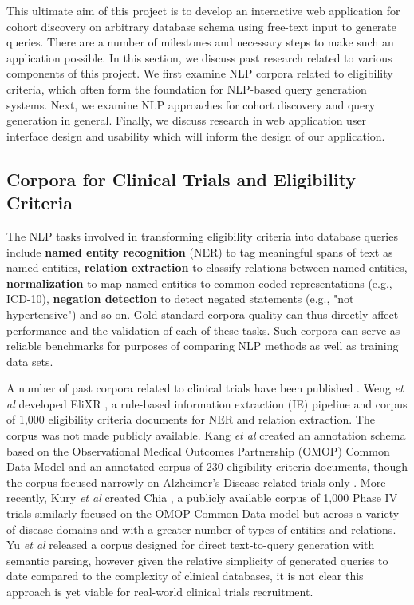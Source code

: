 \documentclass[../main.tex]{subfiles}
\begin{document}
This ultimate aim of this project is to develop an interactive web application for cohort discovery on arbitrary database schema using free-text input to generate queries. There are a number of milestones and necessary steps to make such an application possible. In this section, we discuss past research related to various components of this project. We first examine NLP corpora related to eligibility criteria, which often form the foundation for NLP-based query generation systems. Next, we examine NLP approaches for cohort discovery and query generation in general. Finally, we discuss research in web application user interface design and usability which will inform the design of our application.

\subsection{Corpora for Clinical Trials and Eligibility Criteria}

The NLP tasks involved in transforming eligibility criteria into database queries include \textbf{named entity recognition} (NER) to tag meaningful spans of text as named entities, \textbf{relation extraction} to classify relations between named entities, \textbf{normalization} to map named entities to common coded representations (e.g., ICD-10), \textbf{negation detection} to detect negated statements (e.g., "not hypertensive") and so on. Gold standard corpora quality can thus directly affect performance and the validation of each of these tasks. Such corpora can serve as reliable benchmarks for purposes of comparing NLP methods as well as training data sets. 

A number of past corpora related to clinical trials have been published \cite{weng2011elixr, kang2017eliie, kury2020chia, yu2020}. Weng \textit{et al} developed EliXR \cite{weng2011elixr}, a rule-based information extraction (IE) pipeline and corpus of 1,000 eligibility criteria documents for NER and relation extraction. The corpus was not made publicly available. Kang \textit{et al} created an annotation schema based on the Observational Medical Outcomes Partnership (OMOP) Common Data Model \cite{hripcsak2015observational} and an annotated corpus of 230 eligibility criteria documents, though the corpus focused narrowly on Alzheimer's Disease-related trials only \cite{kang2017eliie}. More recently, Kury \textit{et al} created Chia \cite{kury2020chia}, a publicly available corpus of 1,000 Phase IV trials similarly focused on the OMOP Common Data model but across a variety of disease domains and with a greater number of types of entities and relations. Yu \textit{et al} \cite{yu2020} released a corpus designed for direct text-to-query generation with semantic parsing, however given the relative simplicity of generated queries to date compared to the complexity of clinical databases, it is not clear this approach is yet viable for real-world clinical trials recruitment.
\end{document}
